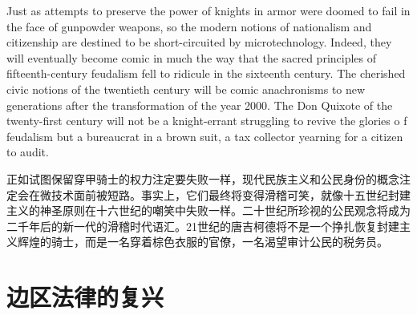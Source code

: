 \begin{Parallel}{97mm}{45mm}
  \ParallelPar
  \ParallelLText
  {Just as attempts to preserve the power of knights in armor were doomed to fail in the face of gunpowder weapons, so the modern notions of nationalism and citizenship are destined to be short-circuited by microtechnology. Indeed, they will eventually become comic in much the way that the sacred principles of fifteenth-century feudalism fell to ridicule in the sixteenth century. The cherished civic notions of the twentieth century will be comic anachronisms to new generations after the transformation of the year 2000. The Don Quixote of the twenty-first century will not be a knight-errant struggling to revive the glories o f feudalism but a bureaucrat in a brown suit, a tax collector yearning for a citizen to audit. }
  
  \ParallelRText
  {\small 正如试图保留穿甲骑士的权力注定要失败一样，现代民族主义和公民身份的概念注定会在微技术面前被短路。事实上，它们最终将变得滑稽可笑，就像十五世纪封建主义的神圣原则在十六世纪的嘲笑中失败一样。二十世纪所珍视的公民观念将成为二千年后的新一代的滑稽时代语汇。21世纪的唐吉柯德将不是一个挣扎恢复封建主义辉煌的骑士，而是一名穿着棕色衣服的官僚，一名渴望审计公民的税务员。}
  \ParallelPar


\section{边区法律的复兴}
  

\end{Parallel}
